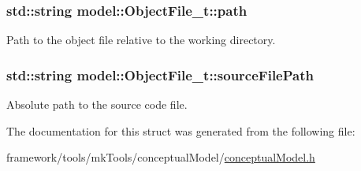 \subsubsection[{\texorpdfstring{path}{path}}]{\setlength{\rightskip}{0pt plus 5cm}std\+::string model\+::\+Object\+File\+\_\+t\+::path}\hypertarget{structmodel_1_1_object_file__t_a2af04334d176e34aa3aa380daa4bef8b}{}\label{structmodel_1_1_object_file__t_a2af04334d176e34aa3aa380daa4bef8b}


Path to the object file relative to the working directory. 

\subsubsection[{\texorpdfstring{source\+File\+Path}{sourceFilePath}}]{\setlength{\rightskip}{0pt plus 5cm}std\+::string model\+::\+Object\+File\+\_\+t\+::source\+File\+Path}\hypertarget{structmodel_1_1_object_file__t_a0de39641da8f6afe767c7e43d347bcf7}{}\label{structmodel_1_1_object_file__t_a0de39641da8f6afe767c7e43d347bcf7}


Absolute path to the source code file. 



The documentation for this struct was generated from the following file\+:\begin{DoxyCompactItemize}
\item 
framework/tools/mk\+Tools/conceptual\+Model/\hyperlink{conceptual_model_8h}{conceptual\+Model.\+h}\end{DoxyCompactItemize}
